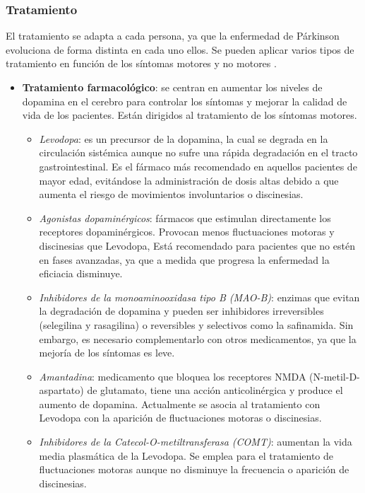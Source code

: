 \subsubsection{Tratamiento}
El tratamiento se adapta a cada persona, ya que la enfermedad de Párkinson evoluciona de forma distinta en cada uno ellos. Se pueden aplicar varios tipos de tratamiento en función de los síntomas motores y no motores \cite{ayala2007enfermedad, estrada2011diagnostico, marin2018enfermedad}.

\begin{itemize}
    \item \textbf{Tratamiento farmacológico}: se centran en aumentar los niveles de dopamina en el cerebro para controlar los síntomas y mejorar la calidad de vida de los pacientes. Están dirigidos al tratamiento de los síntomas motores. 
    \begin{itemize}
        \item \textit{Levodopa}: es un precursor de la dopamina, la cual se degrada en la circulación sistémica aunque no sufre una rápida degradación en el tracto gastrointestinal. Es el fármaco más recomendado en aquellos pacientes de mayor edad, evitándose la administración de dosis altas debido a que aumenta el riesgo de movimientos involuntarios o discinesias.
        \item \textit{Agonistas dopaminérgicos}: fármacos que estimulan directamente los receptores dopaminérgicos. Provocan menos fluctuaciones motoras y discinesias que Levodopa, Está recomendado para pacientes que no estén en fases avanzadas, ya que a medida que progresa la enfermedad la eficiacia disminuye.
        \item \textit{Inhibidores de la monoaminooxidasa tipo B (MAO-B)}: enzimas que evitan la degradación de dopamina y pueden ser inhibidores irreversibles (selegilina y rasagilina) o reversibles y selectivos como la safinamida. Sin embargo, es necesario complementarlo con otros medicamentos, ya que la mejoría de los síntomas es leve.
        \item \textit{Amantadina}: medicamento que bloquea los receptores NMDA (N-metil-D-aspartato) de glutamato, tiene una acción anticolinérgica y produce el aumento de dopamina. Actualmente se asocia al tratamiento con Levodopa con la aparición de fluctuaciones motoras o discinesias. 
        \item\textit{Inhibidores de la Catecol-O-metiltransferasa (COMT)}: aumentan la vida media plasmática de la Levodopa. Se emplea para el tratamiento de fluctuaciones motoras aunque no disminuye la frecuencia o aparición de discinesias.
    \end{itemize}
        

\end{itemize}
